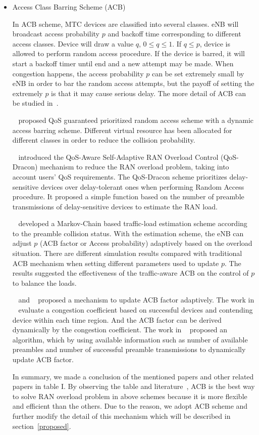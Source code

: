 \begin{itemize}
      \item Access Class Barring Scheme (ACB)

            In ACB scheme, MTC devices are classified into several classes. eNB will broadcast access probability $p$ and backoff time corresponding to different access classes. Device will draw a value $q$, $0\leq q \leq 1$. If $q \leq p$, device is allowed to perform random access procedure. If the device is barred, it will start a backoff timer until end and a new attempt may be made. When congestion happens, the access probability $p$ can be set extremely small by eNB in order to bar the random access attempts, but the payoff of setting the extremely $p$ is that it may cause serious delay. The more detail of ACB can be studied in~\cite{3GPP22.011}.

            ~\cite{cheng2011prioritized} proposed QoS guaranteed prioritized random access scheme with a dynamic access barring scheme. Different virtual resource has been allocated for different classes in order to reduce the collision probability.

            ~\cite{de2015random} introduced the QoS-Aware Self-Adaptive RAN Overload Control (QoS-Dracon) mechanism to reduce the RAN overload problem, taking into account users’ QoS requirements. The QoS-Dracon scheme prioritizes delay-sensitive devices over delay-tolerant ones when performing Random Access procedure. It proposed a simple function based on the number of preamble transmissions of delay-sensitive devices to estimate the RAN load.

            ~\cite{Ho2015Traffic} developed a Markov-Chain based traffic-load estimation scheme according to the preamble collision status. With the estimation scheme, the eNB can adjust $p$ (ACB factor or Access probability) adaptively based on the overload situation. There are different simulation results compared with traditional ACB mechanism when setting different parameters used to update $p$. The results suggested the effectiveness of the traffic-aware ACB on the control of $p$ to balance the loads.

            ~\cite{jihun2016adaptive} and ~\cite{suyang2016dacb} proposed a mechanism to update ACB factor adaptively. The work in ~\cite{jihun2016adaptive} evaluate a congestion coefficient based on successful devices and contending device within each time region. And the ACB factor can be derived dynamically by the congestion coefficient. The work in ~\cite{suyang2016dacb} proposed an algorithm, which by using available information such as number of available preambles and number of successful preamble transmissions to dynamically update ACB factor.

            In summary, we made a conclusion of the mentioned papers and other related papers in table I. By observing the table and literature~\cite{de2015random}, ACB is the best way to solve RAN overload problem in above schemes because it is more flexible and efficient than the others. Due to the reason, we adopt ACB scheme and further modify the detail of this mechanism which will be described in section~\ref{proposed}.


    \end{itemize}
